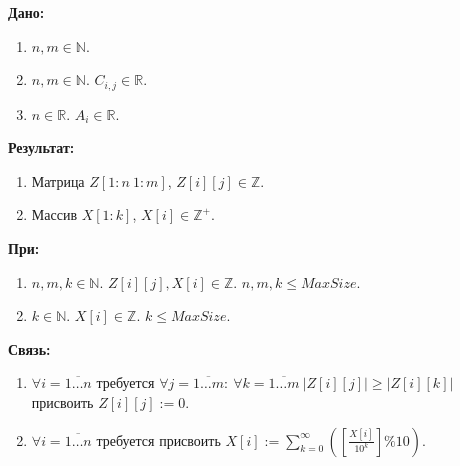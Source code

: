 \textbf{Дано:}
\begin{enumerate}
    \item \(n, m \in \mathbb{N}\).
    \item \(n, m \in \mathbb{N}\). \(C_{i,j} \in \mathbb{R}\).
    \item \(n \in \mathbb{R}\). \(A_i \in \mathbb{R}\).    
\end{enumerate}

\noindent
\textbf{Результат:}
\begin{enumerate}
   \item Матрица \(Z[1{:}n\ 1{:}m]\), \(Z[i][j] \in \mathbb{Z}\). 
   \item Массив \(X[1{:}k]\), \(X[i] \in \mathbb{Z^{+}}\).  
\end{enumerate} 

\noindent
\textbf{При:} 
\begin{enumerate}
    \item \(n, m, k \in \mathbb{N}\). \(Z[i][j], X[i] \in \mathbb{Z}\). \(n, m, k \leq MaxSize\). 
    \item \(k \in \mathbb{N}\). \(X[i] \in \mathbb{Z}\). \(k \leq MaxSize\). 
\end{enumerate}

\noindent
\textbf{Связь:} 
\begin{enumerate}
    \item \(\forall i = \overline{1 \dots n}\) требуется \(\forall j = \overline{1 \dots m}:\ \forall k = \overline{1 \dots m}\ \left\vert Z[i][j] \right\vert \geq \left\vert Z[i][k] \right\vert\) присвоить \(Z[i][j] := 0\).
    \item \(\forall i = \overline{1 \dots n}\) требуется присвоить \(X[i] := \sum\limits_{k = 0}^{\infty} \left(\left[\displaystyle \frac{X[i]}{10^k}\right] \% 10\right)\).    
\end{enumerate}